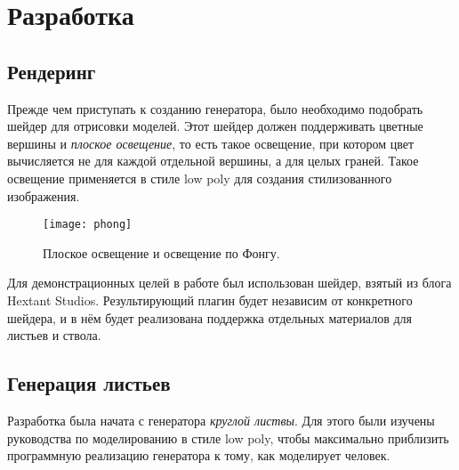\chapter{Разработка}
\section{Рендеринг}
Прежде чем приступать к созданию генератора, было необходимо подобрать шейдер для отрисовки моделей. Этот шейдер должен поддерживать цветные вершины и \emph{плоское освещение}, то есть такое освещение, при котором цвет вычисляется не для каждой отдельной вершины, а для целых граней. Такое освещение применяется в стиле low poly для создания стилизованного изображения. 

\begin{figure}[h]
    \centering
    \texttt{[image: phong]}
    \caption{Плоское освещение и освещение по Фонгу.}
\end{figure}

Для демонстрационных целей в работе был использован шейдер, взятый из блога Hextant Studios\cite{FlatShader}. Результирующий плагин будет независим от конкретного шейдера, и в нём будет реализована поддержка отдельных материалов для листьев и ствола.



\section{Генерация листьев}
Разработка была начата с генератора \emph{круглой листвы}. Для этого были изучены руководства по моделированию в стиле low poly, чтобы максимально приблизить программную реализацию генератора к тому, как моделирует человек.

